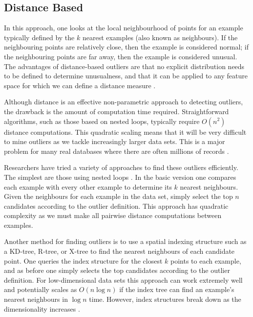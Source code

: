 \subsection{Distance Based}
\label{anomalyDetection:distance}
In this approach, one looks at the local neighbourhood of points for an example
typically defined by the $k$ nearest examples (also known as neighbours). If the
neighbouring points are relatively close, then the example is considered normal;
if the neighbouring points are far away, then the example is considered unusual.
The advantages of distance-based outliers are that no explicit distribution
needs to be defined to determine unusualness, and that it can be applied to any
feature space for which we can define a distance measure \cite{Bay:2003}.

Although distance is an effective non-parametric approach to detecting outliers,
the drawback is the amount of computation time required. Straightforward
algorithms, such as those based on nested loops, typically require $O(n^2)$
distance computations. This quadratic scaling means that it will be very
difficult to mine outliers as we tackle increasingly larger data sets. This is a
major problem for many real databases where there are often millions of records
\cite{Bay:2003}.

Researchers have tried a variety of approaches to find these outliers
efficiently. The simplest are those using nested loops \cite{Bay:2003}. In the
basic version one compares each example with every other example to determine
its $k$ nearest neighbours. Given the neighbours for each example in the data
set, simply select the top $n$ candidates according to the outlier definition.
This approach has quadratic complexity as we must make all pairwise distance
computations between examples.

Another method for finding outliers is to use a spatial indexing structure such
as a KD-tree, R-tree, or X-tree to find the nearest neighbours of each candidate
point. One queries the index structure for the closest $k$ points to each
example, and as before one simply selects the top candidates according to the
outlier definition. For low-dimensional data sets this approach can work
extremely well and potentially scales as $O(n \log n)$ if the index tree can
find an example's nearest neighbours in $\log n$ time. However, index structures
break down as the dimensionality increases \cite{Bay:2003}.

